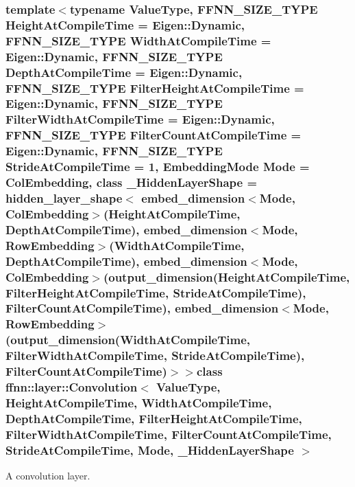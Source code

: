 \subsubsection*{template$<$typename Value\-Type, F\-F\-N\-N\-\_\-\-S\-I\-Z\-E\-\_\-\-T\-Y\-P\-E Height\-At\-Compile\-Time = Eigen\-::\-Dynamic, F\-F\-N\-N\-\_\-\-S\-I\-Z\-E\-\_\-\-T\-Y\-P\-E Width\-At\-Compile\-Time = Eigen\-::\-Dynamic, F\-F\-N\-N\-\_\-\-S\-I\-Z\-E\-\_\-\-T\-Y\-P\-E Depth\-At\-Compile\-Time = Eigen\-::\-Dynamic, F\-F\-N\-N\-\_\-\-S\-I\-Z\-E\-\_\-\-T\-Y\-P\-E Filter\-Height\-At\-Compile\-Time = Eigen\-::\-Dynamic, F\-F\-N\-N\-\_\-\-S\-I\-Z\-E\-\_\-\-T\-Y\-P\-E Filter\-Width\-At\-Compile\-Time = Eigen\-::\-Dynamic, F\-F\-N\-N\-\_\-\-S\-I\-Z\-E\-\_\-\-T\-Y\-P\-E Filter\-Count\-At\-Compile\-Time = Eigen\-::\-Dynamic, F\-F\-N\-N\-\_\-\-S\-I\-Z\-E\-\_\-\-T\-Y\-P\-E Stride\-At\-Compile\-Time = 1, Embedding\-Mode Mode = Col\-Embedding, class \-\_\-\-Hidden\-Layer\-Shape = hidden\-\_\-layer\-\_\-shape$<$              embed\-\_\-dimension$<$\-Mode, Col\-Embedding$>$(\-Height\-At\-Compile\-Time, Depth\-At\-Compile\-Time),              embed\-\_\-dimension$<$\-Mode, Row\-Embedding$>$(\-Width\-At\-Compile\-Time,  Depth\-At\-Compile\-Time),              embed\-\_\-dimension$<$\-Mode, Col\-Embedding$>$(output\-\_\-dimension(\-Height\-At\-Compile\-Time, Filter\-Height\-At\-Compile\-Time, Stride\-At\-Compile\-Time), Filter\-Count\-At\-Compile\-Time),              embed\-\_\-dimension$<$\-Mode, Row\-Embedding$>$(output\-\_\-dimension(\-Width\-At\-Compile\-Time,  Filter\-Width\-At\-Compile\-Time,  Stride\-At\-Compile\-Time), Filter\-Count\-At\-Compile\-Time)$>$$>$class ffnn\-::layer\-::\-Convolution$<$ Value\-Type, Height\-At\-Compile\-Time, Width\-At\-Compile\-Time, Depth\-At\-Compile\-Time, Filter\-Height\-At\-Compile\-Time, Filter\-Width\-At\-Compile\-Time, Filter\-Count\-At\-Compile\-Time, Stride\-At\-Compile\-Time, Mode, \-\_\-\-Hidden\-Layer\-Shape $>$}

A convolution layer. 


